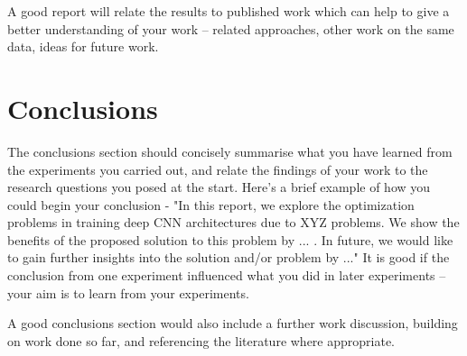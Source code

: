 \documentclass{article}
\begin{document}
A good report will relate the results to  published work which can help to give a better understanding of your work -- related approaches, other work on the same data, ideas for future work. 


\section{Conclusions}
\label{sec:concl}
The conclusions section should concisely summarise what you have learned from the experiments you carried out, and relate the findings of your work to the  research questions you posed at the start. Here's a brief example of how you could begin your conclusion - "In this report, we explore the optimization problems in training deep CNN architectures due to XYZ problems. We show the benefits of the proposed solution to this problem by ... . In future, we would like to gain further insights into the solution and/or problem by ..."  It is good if the conclusion from one experiment influenced what you did in later experiments -- your aim is to learn from your experiments.   


A good conclusions section would also include a further work discussion, building on work done so far, and referencing the literature where appropriate.


\end{document}
